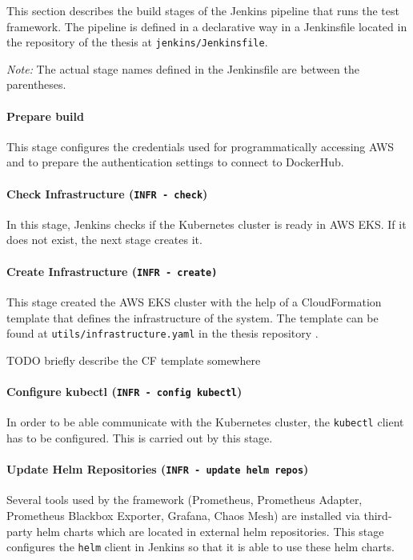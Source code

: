 This section describes the build stages of the Jenkins pipeline that runs the test framework. The pipeline is defined in a declarative way in a Jenkinsfile located in the repository of the thesis \cite{ThesisRepo} at \texttt{jenkins/Jenkinsfile}.

\emph{Note:} The actual stage names defined in the Jenkinsfile are between the parentheses.

\paragraph{Prepare build} This stage configures the credentials used for programmatically accessing AWS and to prepare the authentication settings to connect to DockerHub.

\paragraph{Check Infrastructure (\texttt{INFR - check})} In this stage, Jenkins checks if the Kubernetes cluster is ready in AWS EKS. If it does not exist, the next stage creates it.

\paragraph{Create Infrastructure (\texttt{INFR - create)}} This stage created the AWS EKS cluster with the help of a CloudFormation template that defines the infrastructure of the system. The template can be found at \texttt{utils/infrastructure.yaml} in the thesis repository \cite{ThesisRepo}.


TODO briefly describe the CF template somewhere


\paragraph{Configure kubectl (\texttt{INFR - config kubectl})} In order to be able communicate with the Kubernetes cluster, the \texttt{kubectl} client has to be configured. This is carried out by this stage.

\paragraph{Update Helm Repositories (\texttt{INFR - update helm repos})} Several tools used by the framework (Prometheus, Prometheus Adapter, Prometheus Blackbox Exporter, Grafana, Chaos Mesh) are installed via third-party helm charts which are located in external helm repositories. This stage configures the \texttt{helm} client in Jenkins so that it is able to use these helm charts.

